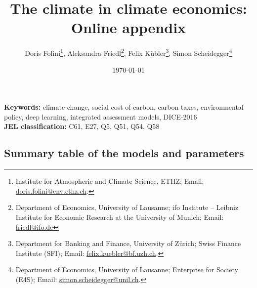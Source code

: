 \documentclass[11pt, a4paper, pdftex, twoside, dvipsnames]{article}
\title{The climate in climate economics: Online appendix}
\author{Doris Folini\thanks{Institute for Atmospheric and Climate Science, ETHZ; Email:
    \href{mailto:doris.folini@env.ethz.ch}{doris.folini@env.ethz.ch}.}, \;
      Aleksandra Friedl\thanks{Department of Economics, University of Lausanne; ifo Institute – Leibniz Institute for Economic Research at the University of Munich; Email: \href{mailto:friedl@ifo.de}{friedl@ifo.de} }, \;
  Felix K\"ubler\thanks{Department for Banking and Finance, University of Z\"urich; Swiss Finance Institute (SFI); Email: \href{mailto:fkubler@gmail.com}{felix.kuebler@bf.uzh.ch}.}, \;
  Simon Scheidegger\thanks{Department of Economics, University of Lausanne; Enterprise for Society (E4S); Email: \href{mailto:simon.scheidegger@unil.ch}{simon.scheidegger@unil.ch}.}}
\date{\today}
\begin{document}
\maketitle



{\small {\bf Keywords:} climate change, social cost of carbon, carbon taxes, environmental policy, deep learning, integrated assessment models, DICE-2016} \\

{\small {\bf JEL classification:} C61, E27, Q5, Q51, Q54, Q58} 


 



\begin{appendices}
\renewcommand{\appendixname}{Online Appendix}

\section{Summary table of the models and parameters}
\label{sec:models_summary}




\end{appendices}
\end{document}
